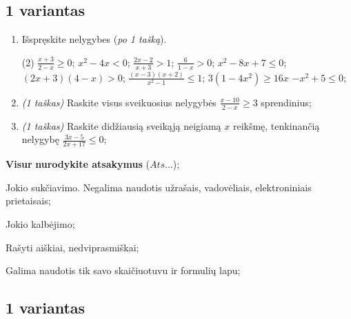 \documentclass[a4paper]{article}
\begin{document}
\vspace*{12mm}

\subsection*{1 variantas}

\begin{enumerate}
      \item Išspręskite nelygybes (\textit{po 1 tašką}).

            \begin{tasks}[item-format={\normalfont}, after-item-skip=2mm](2)
                  \task $\frac{x+3}{2-x} \geqslant 0$;
                  \task $x^2-4x<0$;
                  \task $\frac{2x-2}{x+3}>1$;
                  \task $\frac{6}{1-x}>0$;
                  \task $x^2-8x+7 \leqslant 0$;
                  \task $(2x+3)(4-x)>0$;
                  \task $\frac{(x-3)(x+2)}{x^2-1} \leqslant 1$;
                  \task $3(1-4x^2) \geqslant 16x$
                  \task $-x^2+5 \leq 0$;
            \end{tasks}

      \item \textit{(1 taškas)} Raskite visus sveikuosius nelygybės $\frac{x-10}{2-x}\geqslant 3$ sprendinius;
      \item \textit{(1 taškas)} Raskite didžiausią sveikąją neigiamą $x$ reikšmę, tenkinančią nelygybę $\frac{3x-5}{2x+17} \leqslant 0$;
\end{enumerate}

\begin{small}
      \begin{enumerate*}[label={(\arabic*)}]
            \item \textbf{Visur} \textbf{nurodykite atsakymus} ($Ats\ldots$);
            \item Jokio sukčiavimo. Negalima naudotis užrašais, vadovėliais,
            elektroniniais prietaisais;
            \item Jokio kalbėjimo;
            \item Rašyti aiškiai, nedviprasmiškai;
            \item Galima naudotis tik savo skaičiuotuvu ir formulių lapu;
      \end{enumerate*}
\end{small}

\vspace*{12mm}

\subsection*{1 variantas}
\end{document}
